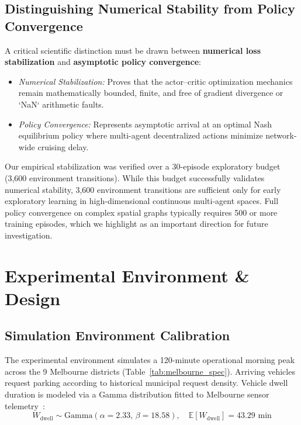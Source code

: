 \documentclass[journal]{IEEEtran}
\begin{document}
\subsection{Distinguishing Numerical Stability from Policy Convergence}
A critical scientific distinction must be drawn between \textbf{numerical loss stabilization} and \textbf{asymptotic policy convergence}:
\begin{itemize}
    \item \textit{Numerical Stabilization:} Proves that the actor--critic optimization mechanics remain mathematically bounded, finite, and free of gradient divergence or `NaN` arithmetic faults.
    \item \textit{Policy Convergence:} Represents asymptotic arrival at an optimal Nash equilibrium policy where multi-agent decentralized actions minimize network-wide cruising delay.
\end{itemize}
Our empirical stabilization was verified over a 30-episode exploratory budget (3,600 environment transitions). While this budget successfully validates numerical stability, 3,600 environment transitions are sufficient only for early exploratory learning in high-dimensional continuous multi-agent spaces. Full policy convergence on complex spatial graphs typically requires 500 or more training episodes, which we highlight as an important direction for future investigation.

\section{Experimental Environment \& Design}
\label{sec:env_design}

\subsection{Simulation Environment Calibration}
The experimental environment simulates a 120-minute operational morning peak across the 9 Melbourne districts (Table~\ref{tab:melbourne_spec}). Arriving vehicles request parking according to historical municipal request density. Vehicle dwell duration is modeled via a Gamma distribution fitted to Melbourne sensor telemetry~\cite{melbourne2024sensors}:
\begin{equation}
W_{\text{dwell}} \sim \text{Gamma}(\alpha = 2.33, \, \beta = 18.58), \quad \mathbb{E}[W_{\text{dwell}}] = 43.29\text{ min}
\end{equation}
\end{document}
